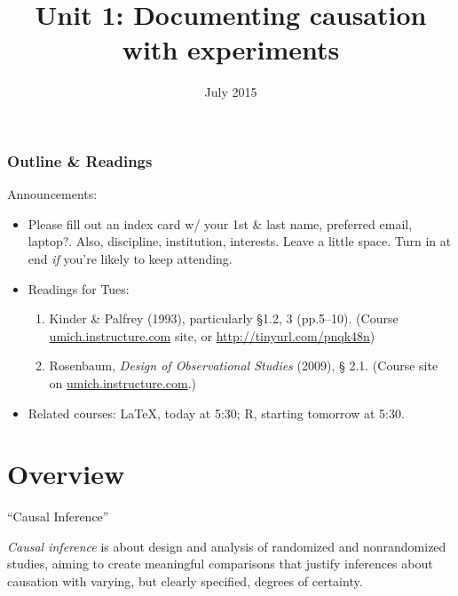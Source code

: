 %



%




\title{Unit 1: Documenting causation with experiments}
\date{July 2015}




  \begin{frame}
    \frametitle{Outline \& Readings}

\tableofcontents[subsectionstyle=show/hide/hide]

  \alert{Announcements:}\\
  \begin{itemize}
\item Please fill out an index card w/ your 1st \& last name,
  preferred email,
  laptop?.  Also, discipline, institution, interests. Leave a little space.  Turn in
  at end \textit{if} you're likely to keep attending.
\item Readings for Tues:
   \begin{enumerate}
     \item Kinder \& Palfrey (1993), particularly \S 1.2, 3
    (pp.5--10). (Course \url{umich.instructure.com} site, or \url{http://tinyurl.com/pnqk48n})
  \item Rosenbaum, \textit{Design of Observational Studies} (2009), \S
    2.1. (Course site on \url{umich.instructure.com}.)
   \end{enumerate}
  \item Related courses: LaTeX, today at 5:30; R, starting tomorrow at 5:30.
  \end{itemize}
  \end{frame}


\section{Overview}

\begin{frame}{``Causal Inference''}

 \textit{Causal inference} is about design and analysis of randomized and nonrandomized studies, aiming to create meaningful comparisons that justify inferences about causation with varying, but clearly specified, degrees of certainty.  
\pause

\end{frame}

